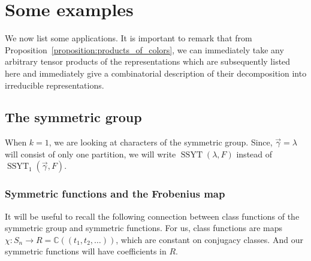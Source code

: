 \documentclass[a4paper,12pt]{amsart}
\theoremstyle{plain}
\theoremstyle{definition}
\theoremstyle{remark}
\DeclareMathOperator{\SSYT}{SSYT}
\begin{document}
\section{Some examples}\label{section:some_examples}
We now list some applications.
It is important to remark that from Proposition~\ref{proposition:products_of_colors}, we can immediately take any arbitrary tensor products of the representations which are subsequently listed here and immediately give a combinatorial description of their decomposition into irreducible representations.

\subsection{The symmetric group}
\label{subsection:symmetric_group}
When $k=1$, we are looking at characters of the symmetric group. Since, $\vec{\gamma}  = \lambda$ will consist of only one partition, we will write $\SSYT(\lambda,F)$ instead of $\SSYT_1(\vec{\gamma},F)$. 

\subsubsection{Symmetric functions and the Frobenius map} \label{section:symmetric_functions}
It will be useful to recall
the following connection between class functions of the symmetric group and symmetric functions. 
For us, class functions are maps $\chi:S_n \rightarrow R = \mathbb{C}((t_1,t_2,\dots))$, which are constant on conjugacy classes. And our symmetric functions will have coefficients in $R$.
\end{document}
